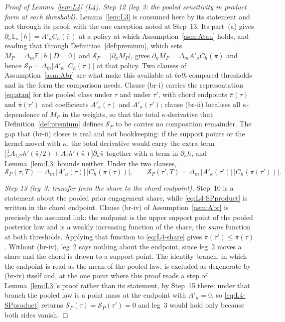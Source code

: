 \documentclass[11pt]{article}
\newcommand{\Eop}{\mathbb{E}}
\newcommand{\Akap}{A'_{\kappa}}
\begin{document}
\begin{proof}[Proof of Lemma~\ref{lem:L4} (L4)]
\emph{Step 12 (leg~3: the pooled sensitivity in product form at each threshold).}
Lemma~\ref{lem:L3} is consumed here by its statement and not through its proof, with the one
exception noted at Step~13. Its part~(a) gives
$\partial_\kappa\Eop_\kappa[h] = \Akap C_h(\bar\pi)$ at a policy at which
Assumption~\ref{asm:Atau} holds, and reading that through Definition~\ref{def:premium}, which sets
$M_P = \Delta_m\Eop[h \mid D=0]$ and $\mathcal S_P = \lvert\partial_\kappa M_P\rvert$, gives
$\partial_\kappa M_P = \Delta_m\Akap C_h(\bar\pi)$ and hence
$\mathcal S_P = \Delta_m\lvert\Akap\rvert\lvert C_h(\bar\pi)\rvert$ at that policy. Two clauses of
Assumption~\ref{asm:Abr} are what make this available at \emph{both} compared thresholds and in the
form the comparison needs. Clause (br-i) carries the
representation \eqref{eq:atau} for the pooled class under $\tau$ and under $\tau'$, with chord
endpoints $\bar\pi(\tau)$ and $\bar\pi(\tau')$ and coefficients $\Akap(\tau)$ and $\Akap(\tau')$;
clause (br-ii) localises all $\kappa$-dependence of $M_P$ in the weights, so that the total
$\kappa$-derivative that Definition~\ref{def:premium} defines $\mathcal S_P$ to be carries no
composition remainder. The gap that (br-ii) closes is real and not bookkeeping: if the support points
or the kernel moved with $\kappa$, the total derivative would carry the extra term
$\bigl[\tfrac12 A_{1/2}h'(\bar\pi/2)+A_1h'(\bar\pi)\bigr]\partial_\kappa\bar\pi$ together with a term
in $\partial_\kappa h$, and Lemma~\ref{lem:L3} bounds neither. Under the two clauses,
\begin{equation}
\label{eq:L4-SPproduct}
\mathcal S_P(\tau,T) = \Delta_m\,\lvert\Akap(\tau)\rvert\,\lvert C_h(\bar\pi(\tau))\rvert,
\qquad
\mathcal S_P(\tau',T) = \Delta_m\,\lvert\Akap(\tau')\rvert\,\lvert C_h(\bar\pi(\tau'))\rvert .
\end{equation}

\emph{Step 13 (leg~3: transfer from the share to the chord endpoint).} Step~10 is a statement about
the pooled prior engagement share, while \eqref{eq:L4-SPproduct} is written in the chord endpoint.
Clause (br-iv) of Assumption~\ref{asm:Abr} is precisely the assumed link: the endpoint is the upper
support point of the pooled posterior law and is a weakly increasing function of the share, the
\emph{same} function at both thresholds. Applying that function to \eqref{eq:L4-share} gives
$\bar\pi(\tau') \le \bar\pi(\tau)$. Without (br-iv), leg~2 says nothing about the endpoint, since
leg~2 moves a share and the chord is drawn to a support point. The identity branch, in which the
endpoint is read as the mean of the pooled law, is excluded as degenerate by (br-iv) itself and, at
the one point where this proof reads a step of Lemma~\ref{lem:L3}'s proof rather than its statement,
by Step~15 there: under that branch the pooled law is a point mass at the endpoint
with $\Akap = 0$, so \eqref{eq:L4-SPproduct} returns
$\mathcal S_P(\tau) = \mathcal S_P(\tau') = 0$ and leg~3 would hold only because both sides vanish.


\end{proof}
\end{document}
